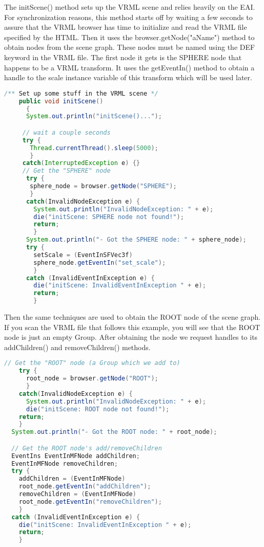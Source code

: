 The initScene() method sets up the VRML scene and relies heavily on the EAI. For synchronization reasons, this method starts off by waiting a few seconds to assure that the VRML browser has time to initialize and read the VRML file specified by the HTML. Then it uses the browser.getNode("aName") method to obtain nodes from the scene graph. These nodes must be named using the DEF keyword in the VRML file. The first node it gets is the SPHERE node that happens to be a VRML transform. It uses the getEventIn() method to obtain a handle to the scale instance variable of this transform which will be used later.

\begin{lstlisting}[language=Java, caption={}, numbers=none, frame=none]
/** Set up some stuff in the VRML scene */
    public void initScene()
      {
      System.out.println("initScene()...");

     // wait a couple seconds
     try {
       Thread.currentThread().sleep(5000);
       }
     catch(InterruptedException e) {}
     // Get the "SPHERE" node
      try {
       sphere_node = browser.getNode("SPHERE");
       }
      catch(InvalidNodeException e) {
        System.out.println("InvalidNodeException: " + e);
        die("initScene: SPHERE node not found!");
        return;
        }
      System.out.println("- Got the SPHERE node: " + sphere_node);
      try {
        setScale = (EventInSFVec3f)
        sphere_node.getEventIn("set_scale");
        }
      catch (InvalidEventInException e) {
        die("initScene: InvalidEventInException " + e);
        return;
        }
\end{lstlisting}

Then the same techniques are used to obtain the ROOT node of the scene graph. If you scan the VRML file that follows this example, you will see that the ROOT node is just an empty Group. After obtaining the node we request handles to its addChildren() and removeChildren() methods.

\begin{lstlisting}[language=Java, caption={}, numbers=none, frame=none]
    // Get the "ROOT" node (a Group which we add to)
    try {
      root_node = browser.getNode("ROOT");
      }
    catch(InvalidNodeException e) {
      System.out.println("InvalidNodeException: " + e);
      die("initScene: ROOT node not found!");
    return;
    }
  System.out.println("- Got the ROOT node: " + root_node);

  // Get the ROOT node's add/removeChildren
  EventIns EventInMFNode addChildren;
  EventInMFNode removeChildren;
  try {
    addChildren = (EventInMFNode)
    root_node.getEventIn("addChildren");
    removeChildren = (EventInMFNode)
    root_node.getEventIn("removeChildren");
    }
  catch (InvalidEventInException e) {
    die("initScene: InvalidEventInException " + e);
    return;
    }
\end{lstlisting}

